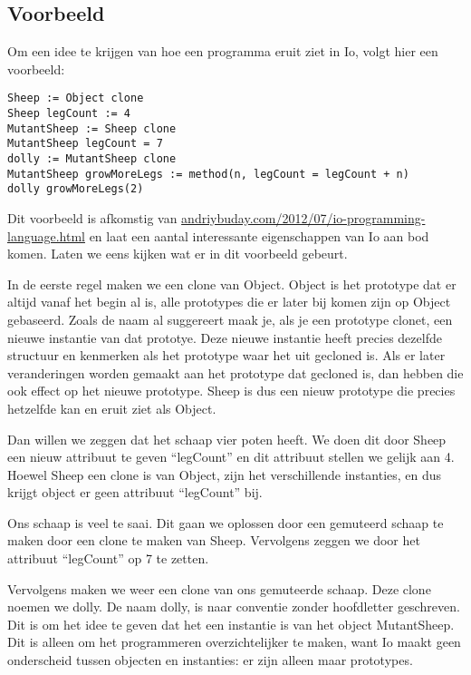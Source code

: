 \documentclass[12pt]{article}
\begin{document}
\subsection*{Voorbeeld}
Om een idee te krijgen van hoe een programma eruit ziet in Io, volgt hier een voorbeeld:
\begin{lstlisting}[frame=single]
Sheep := Object clone
Sheep legCount := 4
MutantSheep := Sheep clone
MutantSheep legCount = 7
dolly := MutantSheep clone
MutantSheep growMoreLegs := method(n, legCount = legCount + n)
dolly growMoreLegs(2)
\end{lstlisting}
Dit voorbeeld is afkomstig van \url{andriybuday.com/2012/07/io-programming-language.html} en laat een aantal interessante eigenschappen van Io aan bod komen. Laten we eens kijken wat er in dit voorbeeld gebeurt.\newline

In de eerste regel maken we een clone van Object. Object is het prototype dat er altijd vanaf het begin al is,
alle prototypes die er later bij komen zijn op Object gebaseerd.
Zoals de naam al suggereert maak je, als je een prototype clonet, een nieuwe instantie van dat prototye.
Deze nieuwe instantie heeft precies dezelfde structuur en kenmerken als het prototype waar het uit gecloned is.
Als er later veranderingen worden gemaakt aan het prototype dat gecloned is, dan hebben die ook effect op het nieuwe prototype.
Sheep is dus een nieuw prototype die precies hetzelfde kan en eruit ziet als Object.\newline

Dan willen we zeggen dat het schaap vier poten heeft.
We doen dit door Sheep een nieuw attribuut te geven ``legCount'' en dit attribuut stellen we gelijk aan 4.
Hoewel Sheep een clone is van Object, zijn het verschillende instanties, en dus krijgt object er geen attribuut ``legCount'' bij.\newline

Ons schaap is veel te saai. Dit gaan we oplossen door een gemuteerd schaap te maken door een clone te maken van Sheep. Vervolgens zeggen we door het attribuut ``legCount'' op 7 te zetten.\newline

Vervolgens maken we weer een clone van ons gemuteerde schaap. Deze clone noemen we dolly. De naam dolly, is naar conventie zonder hoofdletter geschreven.
Dit is om het idee te geven dat het een instantie is van het object MutantSheep.
Dit is alleen om het programmeren overzichtelijker te maken, want Io maakt geen onderscheid tussen objecten en instanties: er zijn alleen maar prototypes.\newline
\end{document}
